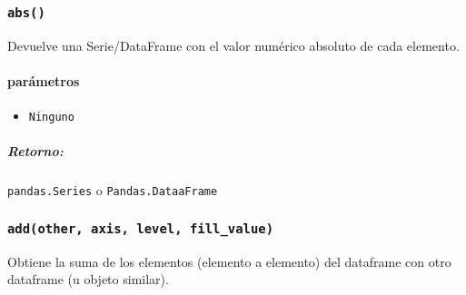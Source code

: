 
        \subsubsection{\texttt{abs()}} Devuelve una Serie/DataFrame con el valor numérico absoluto de cada elemento.
        \paragraph{\textbf{parámetros}}
        \begin{itemize}
            \item \texttt{Ninguno}
        \end{itemize}
        \subparagraph{\textbf{Retorno:}} \texttt{pandas.Series} o \texttt{Pandas.DataaFrame}

        \subsubsection{\texttt{add(other, axis, level, fill\_value)}} Obtiene la suma de los elementos (elemento a elemento) del dataframe con otro dataframe (u objeto similar).
